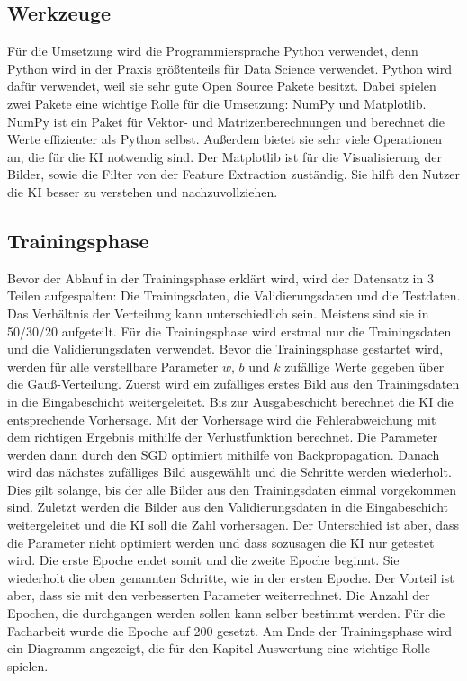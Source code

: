 \documentclass[11pt]{article}
\begin{document}
\subsection{Werkzeuge}
Für die Umsetzung wird die Programmiersprache Python verwendet, denn Python wird in der Praxis größtenteils für Data Science verwendet.
Python wird dafür verwendet, weil sie sehr gute Open Source Pakete besitzt. Dabei spielen zwei Pakete eine wichtige Rolle für die Umsetzung:
NumPy und Matplotlib. NumPy ist ein Paket für Vektor- und Matrizenberechnungen und berechnet die Werte effizienter als Python selbst. Außerdem
bietet sie sehr viele Operationen an, die für die KI notwendig sind. Der Matplotlib ist für die Visualisierung der Bilder, sowie die Filter von der
Feature Extraction zuständig. Sie hilft den Nutzer die KI besser zu verstehen und nachzuvollziehen.

\subsection{Trainingsphase}
Bevor der Ablauf in der Trainingsphase erklärt wird, wird der Datensatz in 3 Teilen aufgespalten: Die Trainingsdaten, die Validierungsdaten
und die Testdaten. Das Verhältnis der Verteilung kann unterschiedlich sein. Meistens sind sie in 50/30/20 aufgeteilt.
Für die Trainingsphase wird erstmal nur die Trainingsdaten und die Validierungsdaten verwendet.
Bevor die Trainingsphase gestartet wird, werden für alle verstellbare Parameter $w$, $b$ und $k$ zufällige Werte gegeben über
die Gauß-Verteilung. Zuerst wird ein zufälliges erstes Bild aus den Trainingsdaten in die Eingabeschicht weitergeleitet.
Bis zur Ausgabeschicht berechnet die KI die entsprechende Vorhersage. Mit der Vorhersage wird die Fehlerabweichung mit dem richtigen
Ergebnis mithilfe der Verlustfunktion berechnet. Die Parameter werden dann durch den SGD optimiert mithilfe von Backpropagation.
Danach wird das nächstes zufälliges Bild ausgewählt und die Schritte werden wiederholt. Dies gilt solange, bis der alle Bilder aus
den Trainingsdaten einmal vorgekommen sind. Zuletzt werden die Bilder aus den Validierungsdaten
in die Eingabeschicht weitergeleitet und die KI soll die Zahl vorhersagen. Der Unterschied ist aber, dass die Parameter nicht optimiert werden
und dass sozusagen die KI nur getestet wird. Die erste Epoche endet somit und die zweite Epoche beginnt. Sie wiederholt die oben genannten Schritte,
wie in der ersten Epoche. Der Vorteil ist aber, dass sie mit den verbesserten Parameter weiterrechnet. Die Anzahl der Epochen, die durchgangen
werden sollen kann selber bestimmt werden. Für die Facharbeit wurde die Epoche auf 200 gesetzt. Am Ende der Trainingsphase wird ein Diagramm
angezeigt, die für den Kapitel Auswertung eine wichtige Rolle spielen.
\end{document}
